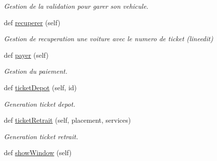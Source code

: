 \begin{DoxyCompactItemize}
\begin{DoxyCompactList}\small\item\em Gestion de la validation pour garer son vehicule. \end{DoxyCompactList}\item 
\hypertarget{classsrc_1_1c_1_1_borne_1_1_borne_a5630778977a8c00550218d1111b70c31}{}def \hyperlink{classsrc_1_1c_1_1_borne_1_1_borne_a5630778977a8c00550218d1111b70c31}{recuperer} (self)\label{classsrc_1_1c_1_1_borne_1_1_borne_a5630778977a8c00550218d1111b70c31}

\begin{DoxyCompactList}\small\item\em Gestion de recuperation une voiture avec le numero de ticket (lineedit) \end{DoxyCompactList}\item 
\hypertarget{classsrc_1_1c_1_1_borne_1_1_borne_ab87b763297487f2742b37867bf0cd95b}{}def \hyperlink{classsrc_1_1c_1_1_borne_1_1_borne_ab87b763297487f2742b37867bf0cd95b}{payer} (self)\label{classsrc_1_1c_1_1_borne_1_1_borne_ab87b763297487f2742b37867bf0cd95b}

\begin{DoxyCompactList}\small\item\em Gestion du paiement. \end{DoxyCompactList}\item 
\hypertarget{classsrc_1_1c_1_1_borne_1_1_borne_ab8ee5ac44c778e723db19acb1a6862ad}{}def \hyperlink{classsrc_1_1c_1_1_borne_1_1_borne_ab8ee5ac44c778e723db19acb1a6862ad}{ticket\+Depot} (self, id)\label{classsrc_1_1c_1_1_borne_1_1_borne_ab8ee5ac44c778e723db19acb1a6862ad}

\begin{DoxyCompactList}\small\item\em Generation ticket depot. \end{DoxyCompactList}\item 
\hypertarget{classsrc_1_1c_1_1_borne_1_1_borne_ad6f41451f4c915ed9352611938a35511}{}def \hyperlink{classsrc_1_1c_1_1_borne_1_1_borne_ad6f41451f4c915ed9352611938a35511}{ticket\+Retrait} (self, placement, services)\label{classsrc_1_1c_1_1_borne_1_1_borne_ad6f41451f4c915ed9352611938a35511}

\begin{DoxyCompactList}\small\item\em Generation ticket retrait. \end{DoxyCompactList}\item 
\hypertarget{classsrc_1_1c_1_1_borne_1_1_borne_a0e090ae35cddb31b63d19e587cf1fa8a}{}def \hyperlink{classsrc_1_1c_1_1_borne_1_1_borne_a0e090ae35cddb31b63d19e587cf1fa8a}{show\+Window} (self)\label{classsrc_1_1c_1_1_borne_1_1_borne_a0e090ae35cddb31b63d19e587cf1fa8a}


\end{DoxyCompactItemize}
